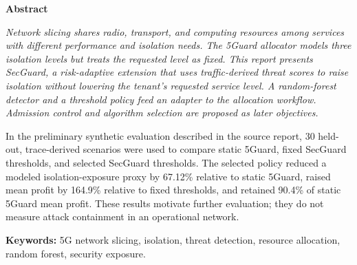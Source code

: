 \documentclass[12pt,phd,times]{pkmthesis}
\begin{document}
\setcounter{page}{1}
\doublespacing

\thispagestyle{empty}

\clearpage
\thispagestyle{empty}

\thispagestyle{empty}

\clearpage

\thispagestyle{empty}
\begingroup
\onehalfspacing
\begin{center}\textbf{Abstract}\end{center}
\itshape
\noindent
Network slicing shares radio, transport, and computing resources among services with different performance and isolation needs. The 5Guard allocator models three isolation levels but treats the requested level as fixed. This report presents SecGuard, a risk-adaptive extension that uses traffic-derived threat scores to raise isolation without lowering the tenant's requested service level. A random-forest detector and a threshold policy feed an adapter to the allocation workflow. Admission control and algorithm selection are proposed as later objectives.

In the preliminary synthetic evaluation described in the source report, 30 held-out, trace-derived scenarios were used to compare static 5Guard, fixed SecGuard thresholds, and selected SecGuard thresholds. The selected policy reduced a modeled isolation-exposure proxy by 67.12\% relative to static 5Guard, raised mean profit by 164.9\% relative to fixed thresholds, and retained 90.4\% of static 5Guard mean profit. These results motivate further evaluation; they do not measure attack containment in an operational network.

\medskip\noindent\textbf{Keywords:} 5G network slicing, isolation, threat detection, resource allocation, random forest, security exposure.
\clearpage
\endgroup
\dominitoc\dominilof\dominilot
\fancyhf{}
\fancyhead[LE]{\bfseries\small{\leftmark}}
\fancyhead[RO]{\bfseries\small{\rightmark}}
\fancyfoot[CE,CO]{\bfseries\thepage}
\renewcommand{\baselinestretch}{1}

\tableofcontents
\clearpage

\listoffigures
\clearpage
\end{document}

